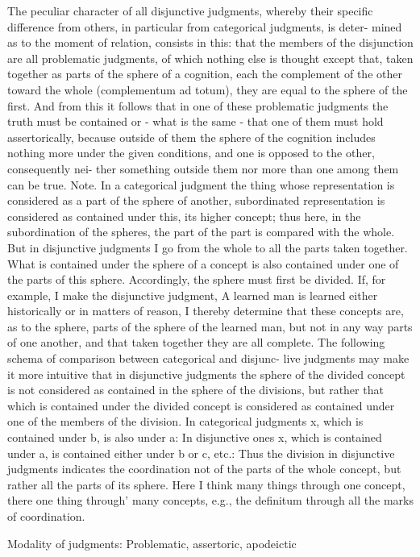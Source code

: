 The peculiar character of all disjunctive judgments, whereby their specific
difference from others, in particular from categorical judgments, is deter-
mined as to the moment of relation, consists in this: that the members of
the disjunction are all problematic judgments, of which nothing else is
thought except that, taken together as parts of the sphere of a cognition,
each the complement of the other toward the whole (complementum ad
totum), they are equal to the sphere of the first. And from this it follows
that in one of these problematic judgments the truth must be contained
or - what is the same - that one of them must hold assertorically, because
outside of them the sphere of the cognition includes nothing more under
the given conditions, and one is opposed to the other, consequently nei-
ther something outside them nor more than one among them can be true.
Note.
In a categorical judgment the thing whose representation is considered as a
part of the sphere of another, subordinated representation is considered as
contained under this, its higher concept; thus here, in the subordination of
the spheres, the part of the part is compared with the whole. But in
disjunctive judgments I go from the whole to all the parts taken together.
What is contained under the sphere of a concept is also contained under
one of the parts of this sphere. Accordingly, the sphere must first be
divided. If, for example, I make the disjunctive judgment, A learned man is
learned either historically or in matters of reason, I thereby determine that
these concepts are, as to the sphere, parts of the sphere of the learned man,
but not in any way parts of one another, and that taken together they are all
complete.
The following schema of comparison between categorical and disjunc-
live judgments may make it more intuitive that in disjunctive judgments the
sphere of the divided concept is not considered as contained in the sphere
of the divisions, but rather that which is contained under the divided
concept is considered as contained under one of the members of the
division.
In categorical judgments x, which is contained under b, is also under a:
In disjunctive ones x, which is contained under a, is contained either under
b or c, etc.:
Thus the division in disjunctive judgments indicates the coordination not
of the parts of the whole concept, but rather all the parts of its sphere.
Here I think many things through one concept, there one thing through' many
concepts, e.g., the definitum through all the marks of coordination.

Modality of judgments: Problematic, assertoric, apodeictic

